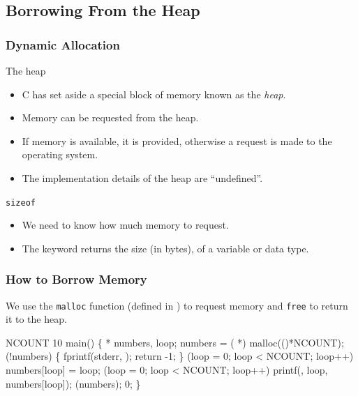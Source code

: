 \documentclass[smaller,table]{beamer}
\begin{document}
\subsection{Borrowing From the Heap}
\begin{frame}
\frametitle{Dynamic Allocation}
\begin{block}{The heap}
\begin{itemize}
\item C has set aside a special block of memory known as the \emph{heap}.
\item Memory can be requested from the heap.
\item If memory is available, it is provided, otherwise a request is made to the operating system.
\item The implementation details of the heap are ``undefined''.
\end{itemize}
\end{block}
\begin{block}{\tt sizeof}
\begin{itemize}
\item We need to know how much memory to request.
\item The  keyword returns the size (in bytes), of a variable or data type.
\end{itemize}
\end{block}
\end{frame}

\begin{frame}[fragile]
\frametitle{How to Borrow Memory}
We use the {\tt malloc} function (defined in ) to request memory and {\tt free} to return it to the heap.
\vspace{-0.1in}
\begin{semiverbatim}
\scriptsize
\kr\kl{} 
\kl{} 
\kl{} NCOUNT 10
\kl{} main()
\kl\{
\kl   {} * numbers, loop;
\kl   numbers = ( *) malloc(()*NCOUNT);
\kl   {} (!numbers)
\kl   \{
\kl      fprintf(stderr, );
\kl      return -1;
\kl   \}
\kl   {} (loop = 0; loop < NCOUNT; loop++)
\kl      numbers[loop] = loop;
\kl
\kl   {} (loop = 0; loop < NCOUNT; loop++)
\kl      printf(, loop, numbers[loop]);
\kl
\kl   {}(numbers);
\kl   {} 0;
\kl\}
\end{semiverbatim}
\end{frame}
\end{document}
